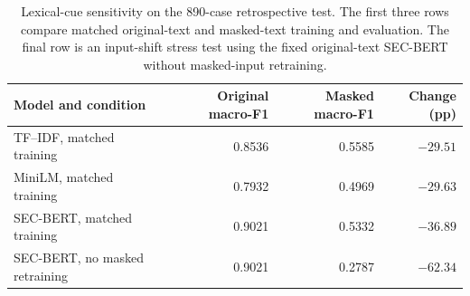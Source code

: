 \documentclass[11pt]{article}
\begin{document}
\begin{table}[t]
  \centering
  \caption{Lexical-cue sensitivity on the 890-case retrospective test. The
  first three rows compare matched original-text and masked-text training and
  evaluation. The final row is an input-shift stress test using the fixed
  original-text SEC-BERT without masked-input retraining.}
  \label{tab:masking-sensitivity}
  \begin{tabular}{lrrr}
    \toprule
    Model and condition & Original macro-F1 & Masked macro-F1 & Change (pp) \\
    \midrule
    TF--IDF, matched training & 0.8536 & 0.5585 & $-29.51$ \\
    MiniLM, matched training & 0.7932 & 0.4969 & $-29.63$ \\
    SEC-BERT, matched training & 0.9021 & 0.5332 & $-36.89$ \\
    SEC-BERT, no masked retraining & 0.9021 & 0.2787 & $-62.34$ \\
    \bottomrule
  \end{tabular}
\end{table}
\end{document}
